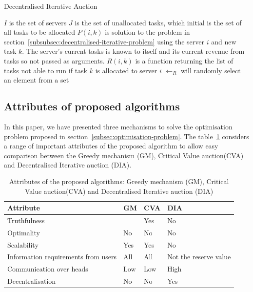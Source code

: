 \begin{algorithm}[H]
    \caption{Decentralised Iterative Auction}
    \label{alg:dia}
    \begin{algorithmic}
        \REQUIRE $I$ is the set of servers
        \REQUIRE $J$ is the set of unallocated tasks, which initial is the set of all tasks to be allocated
        \REQUIRE $P(i, k)$ is solution to the problem in section~\ref{subsubsec:decentralised-iterative-problem}
        using the server $i$ and new task $k$.
        The server's current tasks is known to itself and its current revenue from tasks so not passed as arguments.
        \REQUIRE $R(i, k)$ is a function returning the list of tasks not able to run if task $k$ is allocated to server $i$
        \REQUIRE $\leftarrow_R$ will randomly select an element from a set
                \ENDFOR
            \ENDIF
        \ENDWHILE
    \end{algorithmic}
\end{algorithm}

\subsection{Attributes of proposed algorithms}\label{subsec:attributes-of-proposed-algorithms}
In this paper, we have presented three mechanisms to solve the optimisation problem proposed in
section~\ref{subsec:optimisation-problem}. The table~\ref{tab:attributes_algorithms} considers a range of
important attributes of the proposed algorithm to allow easy comparison between the Greedy mechanism (GM),
Critical Value auction(CVA) and Decentralised Iterative auction (DIA).

\begin{table}[H]
    \centering
    \begin{tabular}{|p{2.2cm}|p{1.5cm}|p{1.5cm}|p{1.5cm}|}
        \hline
        Attribute & GM & CVA & DIA \\ \hline
        Truthfulness & & Yes & No \\ \hline
        Optimality & No & No & No \\ \hline
        Scalability & Yes & Yes & No \\ \hline
        Information requirements from users & All & All & Not the reserve value \\ \hline
        Communication over heads & Low & Low & High \\ \hline
        Decentralisation & No & No & Yes \\ \hline
    \end{tabular}
    \caption{Attributes of the proposed algorithms: Greedy mechanism (GM), Critical Value auction(CVA) and Decentralised Iterative auction (DIA)}
    \label{tab:attributes_algorithms}
\end{table}
